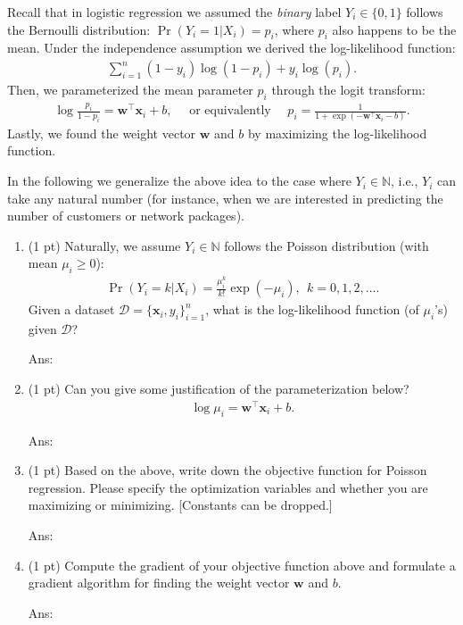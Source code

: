 \documentclass[10pt,letter,notitlepage]{article}
\newcommand{\wv}{\mathbf{w}}
\newcommand{\xv}{\mathbf{x}}
\newcommand{\Dc}{\mathcal{D}}
\newcommand{\ans}[1]{{\color{orange}\textsf{Ans}: #1}}
\newcounter{exercise}
\begin{document}
\begin{exercise}
Recall that in logistic regression we assumed the \emph{binary} label $Y_i \in \{0,1\}$ follows the Bernoulli distribution: $\Pr(Y_i = 1 | X_i) = p_i$, where $p_i$ also happens to be the mean. Under the independence assumption we derived the log-likelihood function:
\begin{align}
\sum_{i=1}^n (1-y_i) \log(1-p_i) + y_i \log(p_i).
\end{align}
Then, we parameterized the mean parameter $p_i$ through the logit transform:
\begin{align}
\log\frac{p_i}{1-p_i} = \wv^\top \xv_i + b, \quad \mbox{ or equivalently } \quad p_i = \frac{1}{1+\exp(-\wv^\top \xv_i - b)}.
\end{align}
Lastly, we found the weight vector $\wv$ and $b$ by maximizing the log-likelihood function. 

In the following we generalize the above idea to the case where $Y_i \in \mathds{N}$, i.e., $Y_i$ can take any natural number (for instance, when we are interested in predicting the number of customers or network packages).

\begin{enumerate}
\item (1 pt) Naturally, we assume $Y_i \in \mathds{N}$ follows the Poisson distribution (with mean $\mu_i \geq 0$):
	\begin{align}
	\Pr(Y_i = k | X_i) = \frac{\mu_i^k}{k!} \exp(-\mu_i), ~~ k = 0, 1, 2, \ldots.
	\end{align}
	Given a dataset $\Dc = \{\xv_i, y_i\}_{i=1}^n$, what is the log-likelihood function (of $\mu_i$'s) given $\Dc$?

\ans{} 
	
\item (1 pt) Can you give some justification of the parameterization below?
	\begin{align}
	\log\mu_i = \wv^\top \xv_i + b.
	\end{align}

\ans{} 
	
\item (1 pt) Based on the above, write down the objective function for Poisson regression. Please specify the optimization variables and whether you are maximizing or minimizing. [Constants can be dropped.]

\ans{} 
	
\item (1 pt) Compute the gradient of your objective function above and formulate a gradient algorithm for finding the weight vector $\wv$ and $b$. 
	
\ans{} 

\end{enumerate}
\end{exercise}
\end{document}
